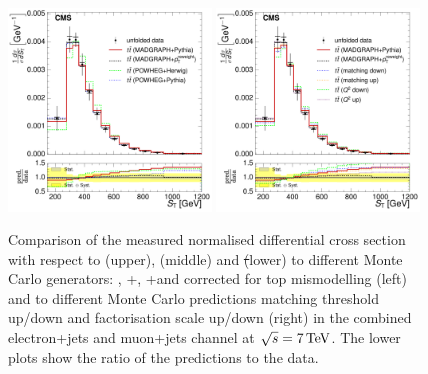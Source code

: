 \begin{figure}[hbtp]
     \includegraphics[width=0.48\textwidth]{Chapters/04_Analysis/04b_XSections/images/results/fit/7TeV/ST/central/normalised_xsection_combined_different_generators.pdf}\hfill
     \includegraphics[width=0.48\textwidth]{Chapters/04_Analysis/04b_XSections/images/results/fit/7TeV/ST/central/normalised_xsection_combined_systematics_shifts.pdf}\\
     \caption[Comparison of the measured normalised differential cross section with respect to \met, \HT and
     \st to different Monte Carlo generators and predictions at $\roots=7\TeV$.]{Comparison of the measured
     normalised differential cross section with respect to \met (upper), \HT (middle) and \st (lower) to
     different Monte Carlo generators: \MADGRAPH, \POWHEG+\HERWIG, \POWHEG+\PYTHIA and \MADGRAPH corrected for
     top \pt mismodelling (left) and to different Monte Carlo predictions matching threshold up/down and
     factorisation scale up/down (right) in the combined electron+jets and muon+jets channel at
     $\roots=7\TeV$. The lower plots show the ratio of the predictions to the data.}
     \label{fig:result_MET_HT_ST_7TeV_combined}
\end{figure}

